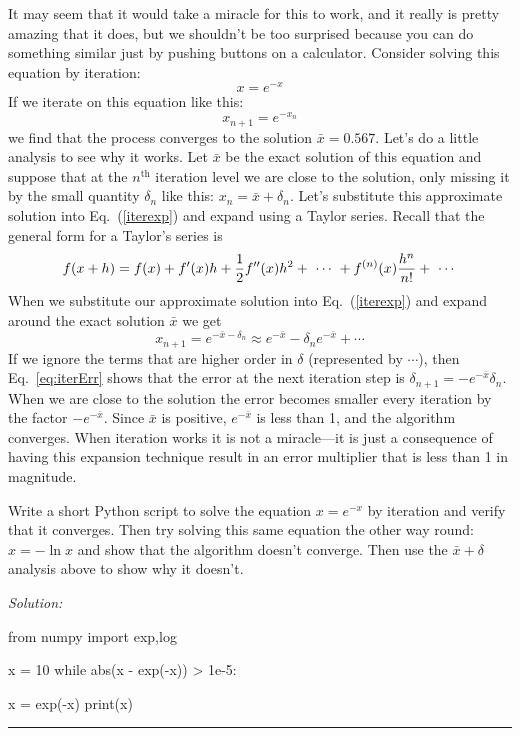 It may seem that it would take a miracle for this to work, and
it really is pretty amazing that it does, but we shouldn't be
too surprised because you can do something similar just by
pushing buttons on a calculator. Consider solving this equation
by iteration:
\begin{equation}
    x=e^{-x}
\end{equation}
If we iterate on this equation like this:
\begin{equation}
    x_{n+1}=e^{-x_n}
    \label{iterexp}
\end{equation}
we find that the process converges to the solution
$\bar{x}=0.567$. Let's do a little analysis to see why it
works. Let $\bar{x}$ be the exact solution of this equation and
suppose that at the $n^\mathrm{th}$ iteration level we are
close to the solution, only missing it by the small quantity
$\delta_n$ like this: $x_n = \bar{x} + \delta_n$.  Let's
substitute this approximate solution into Eq.~(\ref{iterexp})
and expand using a Taylor series.  Recall that the general form
for a Taylor's series is
\begin{equation}\label{eq:Taylor2}
    f(x+h) = f(x) + f'(x) h + {1 \over 2} f''(x) h^2 +
    ~\cdots~+ f^{(n)}(x) {h^n \over n!}
    +~\cdots
\end{equation}
When we substitute our approximate solution into
Eq.~(\ref{iterexp}) and expand around the exact solution
$\bar{x}$ we get
\begin{equation}\label{eq:iterErr}
    x_{n+1} = e^{-\bar{x}-\delta_n} \approx
    e^{-\bar{x}} -\delta_n e^{-\bar{x}} + \cdots
\end{equation}
If we ignore the terms that are higher order in $\delta$
(represented by $\cdots$), then Eq.~\eqref{eq:iterErr} shows
that the error at the next iteration step is $\delta_{n+1} = -
e^{-\bar{x}} \delta_n$. When we are close to the solution the
error becomes smaller every iteration by the factor
$-e^{-\bar{x}}$. Since $\bar{x}$ is positive, $e^{-\bar{x}}$ is
less than 1, and the algorithm converges. When iteration works
it is not a miracle---it is just a consequence of having this
expansion technique result in an error multiplier that is less
than 1 in magnitude.

\begin{enumerate}
\probtwo \label{P:19.2} Write a short Python script to solve the
    equation $x=e^{-x}$ by iteration and verify that it
    converges. Then try solving this same equation the other way
    round: $x=-\ln{x}$ and show that the algorithm doesn't
    converge. Then use the $\bar{x}+\delta$ analysis above to
    show why it doesn't.
\end{enumerate}
\ifsolutions
\textit{Solution:}\\
\begin{codeexample}
\begin{VerbatimOut}{\listingFile}
from numpy import exp,log


x = 10
while abs(x - exp(-x)) > 1e-5:

    x = exp(-x)
    print(x)

    
\end{VerbatimOut}
\end{codeexample}
\else
\noindent\rule{5 in}{0.01 in}
\fi

